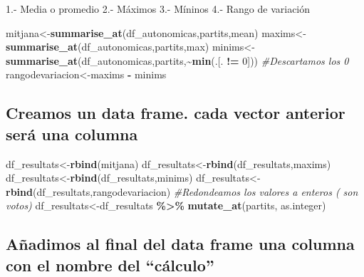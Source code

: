 \documentclass[
]{article}
\newenvironment{Shaded}{\begin{snugshade}}{\end{snugshade}}
\newcommand{\CommentTok}[1]{\textcolor[rgb]{0.56,0.35,0.01}{\textit{#1}}}
\newcommand{\DecValTok}[1]{\textcolor[rgb]{0.00,0.00,0.81}{#1}}
\newcommand{\FunctionTok}[1]{\textcolor[rgb]{0.13,0.29,0.53}{\textbf{#1}}}
\newcommand{\NormalTok}[1]{#1}
\newcommand{\OtherTok}[1]{\textcolor[rgb]{0.56,0.35,0.01}{#1}}
\newcommand{\SpecialCharTok}[1]{\textcolor[rgb]{0.81,0.36,0.00}{\textbf{#1}}}
\begin{document}
1.- Media o promedio 2.- Máximos 3.- Míninos 4.- Rango de variación

\begin{Shaded}
\begin{Highlighting}[]
\NormalTok{mitjana}\OtherTok{\textless{}{-}}\FunctionTok{summarise\_at}\NormalTok{(df\_autonomicas,partits,mean)}
\NormalTok{maxims}\OtherTok{\textless{}{-}}\FunctionTok{summarise\_at}\NormalTok{(df\_autonomicas,partits,max)}
\NormalTok{minims}\OtherTok{\textless{}{-}}\FunctionTok{summarise\_at}\NormalTok{(df\_autonomicas,partits,}\SpecialCharTok{\textasciitilde{}}\FunctionTok{min}\NormalTok{(.[. }\SpecialCharTok{!=} \DecValTok{0}\NormalTok{])) }\CommentTok{\#Descartamos los 0}
\NormalTok{rangodevariacion}\OtherTok{\textless{}{-}}\NormalTok{maxims }\SpecialCharTok{{-}}\NormalTok{ minims}
\end{Highlighting}
\end{Shaded}

\hypertarget{creamos-un-data-frame.-cada-vector-anterior-seruxe1-una-columna}{%
\subsection{Creamos un data frame. cada vector anterior será una
columna}\label{creamos-un-data-frame.-cada-vector-anterior-seruxe1-una-columna}}

\begin{Shaded}
\begin{Highlighting}[]
\NormalTok{df\_resultats}\OtherTok{\textless{}{-}}\FunctionTok{rbind}\NormalTok{(mitjana)}
\NormalTok{df\_resultats}\OtherTok{\textless{}{-}}\FunctionTok{rbind}\NormalTok{(df\_resultats,maxims)}
\NormalTok{df\_resultats}\OtherTok{\textless{}{-}}\FunctionTok{rbind}\NormalTok{(df\_resultats,minims)}
\NormalTok{df\_resultats}\OtherTok{\textless{}{-}}\FunctionTok{rbind}\NormalTok{(df\_resultats,rangodevariacion)}
\CommentTok{\#Redondeamos los valores a enteros ( son votos) }
\NormalTok{df\_resultats}\OtherTok{\textless{}{-}}\NormalTok{df\_resultats }\SpecialCharTok{\%\textgreater{}\%} \FunctionTok{mutate\_at}\NormalTok{(partits, as.integer)}
\end{Highlighting}
\end{Shaded}

\hypertarget{auxf1adimos-al-final-del-data-frame-una-columna-con-el-nombre-del-cuxe1lculo}{%
\subsection{Añadimos al final del data frame una columna con el nombre
del
``cálculo''}\label{auxf1adimos-al-final-del-data-frame-una-columna-con-el-nombre-del-cuxe1lculo}}
\end{document}

